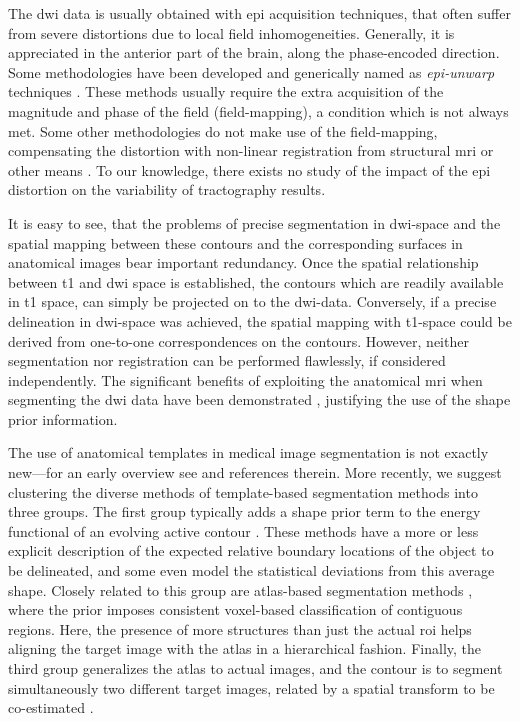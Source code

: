 The \ac{dwi} data is usually obtained with \ac{epi}
acquisition techniques, that often suffer from severe distortions due to 
local field inhomogeneities. Generally, it is appreciated in the anterior
part of the brain, along the phase-encoded direction. Some methodologies have
been developed and generically named as \emph{\ac{epi}-unwarp} techniques
\cite{holland_efficient_2010,hsu_correction_2009,jezzard_characterization_2005,
reber_correction_2005}. These methods usually 
require the extra acquisition of the magnitude and phase of
the field (field-mapping), a condition which is not always met. Some other 
methodologies do not make use of the field-mapping, compensating the distortion
with non-linear registration from structural \ac{mri} or other means
\citep{andersson_modeling_2001}. To our knowledge, there exists no study
of the impact of the \ac{epi} distortion on the variability of tractography
results. 

It is easy to see, that the problems of precise segmentation in \ac{dwi}-space and the spatial mapping between these contours and the corresponding surfaces in anatomical images bear important redundancy. Once the spatial relationship between \ac{t1} and \ac{dwi} space is established, the contours which are readily available in \ac{t1} space, can simply be projected on to the \ac{dwi}-data. Conversely, if a precise delineation in \ac{dwi}-space was achieved, the spatial mapping with \ac{t1}-space could be derived from one-to-one correspondences on the contours. However, neither segmentation nor registration can be performed flawlessly, if considered independently. The significant benefits of exploiting the anatomical \ac{mri} when segmenting the \ac{dwi} data have been demonstrated \cite{zollei_improved_2010}, justifying the use
of the shape prior information. 

The use of anatomical templates in medical image segmentation is not exactly new---for an early overview see \citep{McInerney1996} and references therein. More recently, we suggest clustering the diverse methods of template-based segmentation methods into three groups. The first group typically adds a shape prior term to the energy functional of an evolving active contour \citep{Rousson2002,Chen2002,Paragios2003,Vemuri2003a,Yezzi2003a,Gastaud2004,Chan2005,Cremers2006,Bresson2006a,Ayvaci2007,Schmid2008}.
These methods have a more or less explicit description of the expected relative boundary locations of the object to be delineated, and some even model the statistical deviations from this average shape. Closely related to this group are atlas-based segmentation methods \citep{Pohl2005,Pohl2006,Wang2006,Gorthi2009,Gorthi2011}, where the prior imposes consistent voxel-based classification of contiguous regions. Here, the presence of more structures than just the actual \ac{roi} helps aligning the target image with the atlas in a hierarchical fashion. Finally, the third group generalizes the atlas to actual images, and the contour is to segment simultaneously two different target images, related by a spatial transform to be co-estimated \citep{Wyatt2003,Yezzi2003}.

